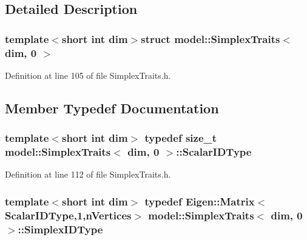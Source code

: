 \subsection{Detailed Description}
\subsubsection*{template$<$short int dim$>$struct model\+::\+Simplex\+Traits$<$ dim, 0 $>$}



Definition at line 105 of file Simplex\+Traits.\+h.



\subsection{Member Typedef Documentation}
\hypertarget{structmodel_1_1_simplex_traits_3_01dim_00_010_01_4_a19c8cef56a03cfffe86e210f5f8faae5}{}
\subsubsection[{Scalar\+I\+D\+Type}]{\setlength{\rightskip}{0pt plus 5cm}template$<$short int dim$>$ typedef size\+\_\+t {\bf model\+::\+Simplex\+Traits}$<$ {\bf dim}, 0 $>$\+::{\bf Scalar\+I\+D\+Type}}\label{structmodel_1_1_simplex_traits_3_01dim_00_010_01_4_a19c8cef56a03cfffe86e210f5f8faae5}


Definition at line 112 of file Simplex\+Traits.\+h.

\hypertarget{structmodel_1_1_simplex_traits_3_01dim_00_010_01_4_a09552e4c13ca04976647b467a63190f0}{}
\subsubsection[{Simplex\+I\+D\+Type}]{\setlength{\rightskip}{0pt plus 5cm}template$<$short int dim$>$ typedef Eigen\+::\+Matrix$<${\bf Scalar\+I\+D\+Type},1,{\bf n\+Vertices}$>$ {\bf model\+::\+Simplex\+Traits}$<$ {\bf dim}, 0 $>$\+::{\bf Simplex\+I\+D\+Type}}\label{structmodel_1_1_simplex_traits_3_01dim_00_010_01_4_a09552e4c13ca04976647b467a63190f0}


